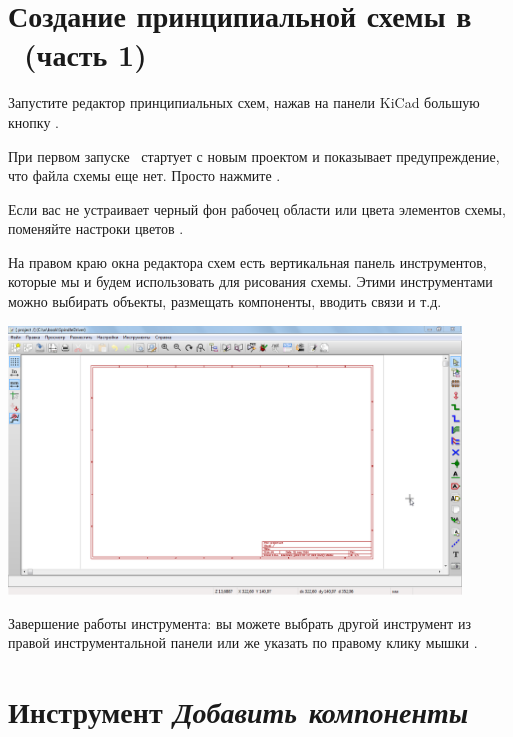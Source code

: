 \section{Создание принципиальной схемы в \ (часть 1)}

Запустите редактор принципиальных схем, нажав на панели KiCad большую кнопку
\icoesch.

При первом запуске \ стартует с новым проектом и
показывает предупреждение, что файла схемы еще нет. Просто нажмите .

Если вас не устраивает черный фон рабочец области или цвета элементов схемы,
поменяйте настроки цветов . 

На правом краю окна редактора схем есть вертикальная панель инструментов,
которые мы и будем использовать для рисования схемы. Этими инструментами можно
выбирать объекты, размещать компоненты, вводить связи и т.д.

\includegraphics[width=0.9\textwidth]{kicad/ee15.png}

Завершение работы инструмента: вы можете выбрать другой инструмент из правой
инструментальной панели или же указать  по правому
клику мышки \keys{\rms}.

\section{Инструмент \emph{Добавить компоненты}}

